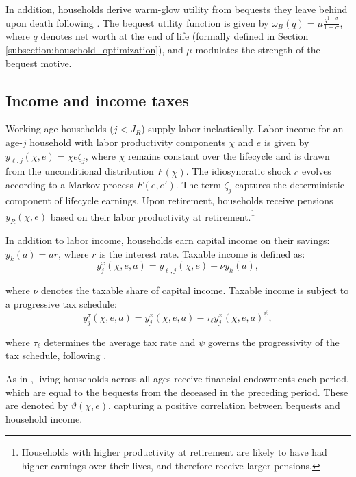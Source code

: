 \documentclass[parskip=full]{article}
\begin{document}
In addition, households derive warm-glow utility from bequests they leave behind upon death following \citet{cagetti-denardi-2006}. The bequest utility function is given by $\omega_{B}(q)=\mu \frac{q^{1-\sigma}}{1-\sigma}$, where $q$ denotes net worth at the end of life (formally defined in Section \ref{subsection:household_optimization}), and $\mu$ modulates the strength of the bequest motive.

\subsection{Income and income taxes}\label{subsection:income}

Working-age households ($j<J_{R}$) supply labor inelastically. Labor income for an age-$j$ household with labor productivity components $\chi$ and $e$ is given by $y_{\ell,j}(\chi,e)=\chi e\zeta_j$, where $\chi$ remains constant over the lifecycle and is drawn from the unconditional distribution $\hat{F}(\chi)$. The idiosyncratic shock $e$ evolves according to a Markov process $F(e,e')$. The term $\zeta_j$ captures the deterministic component of lifecycle earnings. Upon retirement, households receive pensions $y_{R}(\chi,e)$ based on their labor productivity at retirement.\footnote{Households with higher productivity at retirement are likely to have had higher earnings over their lives, and therefore receive larger pensions.}

In addition to labor income, households earn capital income on their savings: $y_{k}(a)=ar$, where $r$ is the interest rate. Taxable income is defined as:
\begin{equation*}\label{eq:taxable_labor_income}
  y^{x}_{j}(\chi,e,a) =y_{\ell,j}(\chi,e)+\nu y_{k}(a),
\end{equation*}

\noindent where $\nu$ denotes the taxable share of capital income. Taxable income is subject to a progressive tax schedule:
\begin{equation}\label{eq:income_tax}
  y^{\tau}_{j}(\chi,e,a) = y^{x}_{j}(\chi,e,a)-\tau_{\ell}y^{x}_{j}(\chi,e,a)^{\psi},
\end{equation}

\noindent where $\tau_{\ell}$ determines the average tax rate and $\psi$ governs the progressivity of the tax schedule, following \citep{hsv-2020}.

As in \citet{kkk-2021}, living households across all ages receive financial endowments each period, which are equal to the bequests from the deceased in the preceding period. These are denoted by $\vartheta (\chi,e)$, capturing a positive correlation between bequests and household income.
\end{document}
